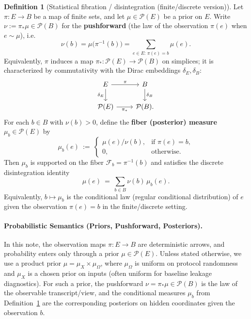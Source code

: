 \documentclass[11pt,a4paper]{article}
\theoremstyle{definition}
\newtheorem{definition}{Definition}[section]
\theoremstyle{plain}
\newcommand{\cF}{\mathcal{F}}
\newcommand{\Prob}{\mathcal{P}}
\begin{document}
\begin{definition}[Statistical fibration / disintegration (finite/discrete version)]
\label{def:statistical-fibration}
Let $\pi:E\to B$ be a map of finite sets, and let $\mu\in\Prob(E)$ be a prior on $E$.
Write $\nu := \pi_*\mu \in \Prob(B)$ for the \textbf{pushforward} (the law of the observation $\pi(e)$ when $e\sim\mu$), i.e.
\[
\nu(b)=\mu\!\bigl(\pi^{-1}(b)\bigr)=\sum_{e\in E:\,\pi(e)=b}\mu(e).
\]
Equivalently, $\pi$ induces a map $\pi_*:\Prob(E)\to\Prob(B)$ on simplices; it is characterized by commutativity with the Dirac embeddings $\delta_E,\delta_B$:
\[
\begin{tikzcd}
E \arrow[r, "\pi"] \arrow[d, "\delta_E"'] & B \arrow[d, "\delta_B"] \\
\Prob(E) \arrow[r, "\pi_*"'] & \Prob(B).
\end{tikzcd}
\]
For each $b\in B$ with $\nu(b)>0$, define the \textbf{fiber (posterior) measure} $\mu_b\in\Prob(E)$ by
\[
\mu_b(e)
\ :=\
\begin{cases}
\mu(e)/\nu(b), & \text{if }\pi(e)=b,\\
0, & \text{otherwise.}
\end{cases}
\]
Then $\mu_b$ is supported on the fiber $\cF_b=\pi^{-1}(b)$ and satisfies the discrete disintegration identity
\[
\mu(e)\ =\ \sum_{b\in B}\nu(b)\,\mu_b(e).
\]
Equivalently, $b\mapsto \mu_b$ is the conditional law (regular conditional distribution) of $e$ given the observation $\pi(e)=b$ in the finite/discrete setting.
\end{definition}

\paragraph{Probabilistic Semantics (Priors, Pushforward, Posteriors).}
\label{par:probabilistic-semantics}
In this note, the observation maps $\pi:E\to B$ are deterministic arrows, and probability enters only through a prior $\mu\in\Prob(E)$.
Unless stated otherwise, we use a product prior $\mu=\mu_X\times \mu_\Omega$, where $\mu_\Omega$ is uniform on protocol randomness and $\mu_X$ is a chosen prior on inputs (often uniform for baseline leakage diagnostics).
For such a prior, the pushforward $\nu=\pi_*\mu\in\Prob(B)$ is the law of the observable transcript/view, and the conditional measures $\mu_b$ from Definition~\ref{def:statistical-fibration} are the corresponding posteriors on hidden coordinates given the observation $b$.
\end{document}
